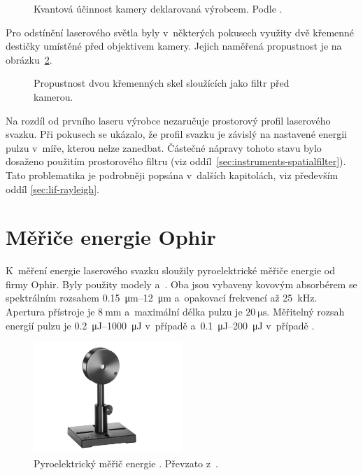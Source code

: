 \begin{figure}[htp]
	\centering
	
	\caption{Kvantová účinnost kamery deklarovaná výrobcem.
		Podle \cite{pimax-datasheet}.}
	\label{fig:instruments-cameraeff}
\end{figure}

Pro odstínění laserového světla byly v~některých pokusech využity dvě
křemenné destičky umístěné před objektivem kamery.
Jejich naměřená propustnost je na obrázku~\ref{fig:instruments-camerafilter}.

\begin{figure}[htp]
	\centering
	
	\caption{Propustnost dvou křemenných skel sloužících jako filtr
		před kamerou.}
	\label{fig:instruments-camerafilter}
\end{figure}

Na rozdíl od prvního laseru výrobce nezaručuje prostorový profil
laserového svazku.
Při pokusech se ukázalo, že profil svazku je závislý
na nastavené energii pulzu v~míře, kterou nelze zanedbat.
Částečné nápravy tohoto stavu bylo dosaženo použitím prostorového filtru
(viz oddíl~\ref{sec:instruments-spatialfilter}).
Tato problematika je podrobněji popsána v~dalších kapitolách,
viz především oddíl \ref{sec:lif-rayleigh}.

\section{Měřiče energie Ophir}
\label{sec:instruments-powermeter}
K~měření energie laserového svazku sloužily pyroelektrické měřiče energie
od firmy Ophir.
Byly použity modely  a~.
Oba jsou vybaveny kovovým absorbérem se spektrálním rozsahem
\SIrange{0.15}{12}{\micro\metre}
a~opakovací frekvencí až \SI{25}{\kilo\hertz}.
Apertura přístroje je $\SI{8}{\milli\metre}$
a~maximální délka pulzu je $\SI{20}{\micro\second}$.
\autocites{pe9-datasheet,pe9esc-datasheet}
Měřitelný rozsah energií pulzu je \SIrange{0.2}{1000}{\micro\joule}
v~případě \autocite{pe9-datasheet}
a~\SIrange{0.1}{200}{\micro\joule} v~případě 
\autocite{pe9esc-datasheet}.

\begin{figure}[htp]
	\centering
	\includegraphics[width=0.5\textwidth]{img/ophir-pe9esc}
	\caption{Pyroelektrický měřič energie .
		Převzato z~\cite{pe9esc-datasheet}.}
	\label{fig:instruments-powermeter}
\end{figure}

